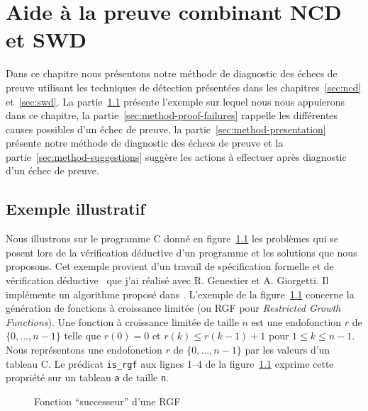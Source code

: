 
\chapter{Aide à la preuve combinant NCD et SWD}
\label{sec:method}

\chapterintro


Dans ce chapitre nous présentons notre méthode de diagnostic des échecs de
preuve utilisant les techniques de détection présentées dans les
chapitres~\ref{sec:ncd} et~\ref{sec:swd}.
La partie~\ref{sec:method-ex} présente l'exemple sur lequel nous nous
appuierons dans ce chapitre, la partie~\ref{sec:method-proof-failures} rappelle
les différentes causes possibles d'un échec de preuve, la
partie~\ref{sec:method-presentation} présente notre méthode de diagnostic des
échecs de preuve et la partie~\ref{sec:method-suggestions} suggère les actions
à effectuer après diagnostic d'un échec de preuve.


\section{Exemple illustratif}
\label{sec:method-ex}


Nous illustrons sur le programme C donné en figure~\ref{fig:rgf1} les problèmes
qui se posent lors de la vérification déductive d'un programme et les solutions
que nous proposons.
Cet exemple provient d'un travail de spécification formelle et de vérification
déductive~\cite{Genestier/TAP15} que j'ai réalisé avec R. Genestier et
A. Giorgetti.
Il implémente un algorithme proposé dans \cite[page 235]{Arndt/10}.
L'exemple de la figure~\ref{fig:rgf1} concerne la génération de fonctions à
croissance limitée (ou RGF pour \textit{Restricted Growth Functions}).
Une fonction à croissance limitée de taille $n$ est une endofonction $r$ de
$\{0, ..., n-1\}$ telle que $r(0) = 0$ et $r(k) \le r(k-1)+1$ pour
$1 \le k \le n-1$.
Nous représentons une endofonction $r$ de $\{0, ..., n-1\}$ par les valeurs d'un
tableau C.
Le prédicat \acsl \lstinline{is_rgf} aux lignes 1--4 de la figure~\ref{fig:rgf1}
exprime cette propriété sur un tableau \lstinline'a' de taille \lstinline'n'.


\begin{figure}[tb]
  \centering
  
  \caption{Fonction ``successeur'' d'une RGF \label{fig:rgf1}}
\end{figure}


